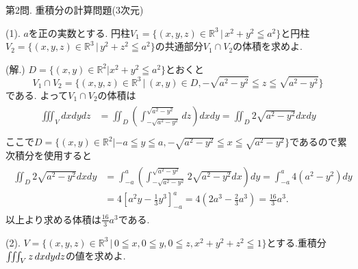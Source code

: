 \documentclass[dvipdfmx,a4paper,11pt]{article}
\newcommand{\R}{\mathbb{R}}
\theoremstyle{definition}
\begin{document}


\vspace{11pt}
{\Large 第2問.} 重積分の計算問題(3次元) 
\vspace{11pt}

{\large(1). $a$を正の実数とする. 円柱$V_1= \{ (x,y,z) \in \R^3 \,|\,x^2 + y^2 \leqq a^2\}$と円柱$V_2 = \{ (x,y,z) \in \R^3 \,|\, y^2 + z^2 \leqq a^2 \}$の共通部分$V_1 \cap V_2$の体積を求めよ.}\vspace{4pt}

\hspace{-11pt}(解.)
$D=\{ (x,y) \in \R^2 | x^2 + y^2 \leqq a^2\}$とおくと
$$
V_1 \cap V_2= \{ (x,y,z) \in \R^3 \,|\, (x,y) \in D, -\sqrt{a^2 -y^2} \leqq z \leqq  \sqrt{a^2-y^2} \}
$$
である. よって$V_1 \cap V_2$の体積は
\begin{align*}
\begin{split}
\iiint_{V} dxdydz 
&=
\iint_{D} \left( \int_{-\sqrt{a^2-y^2}}^{\sqrt{a^2 -y^2} } dz \right) dxdy
= \iint_{D} 2\sqrt{a^2  -y^2}dxdy \\
    \end{split}
  \end{align*}
  ここで$D=\{ (x,y) \in \R^2 | -a \leqq y \leqq a, -\sqrt{a^2 -y^2} \leqq x \leqq  \sqrt{a^2-y^2} \}$であるので累次積分を使用すると
 \begin{align*}
\begin{split}
\iint_{D} 2\sqrt{a^2  -y^2}dxdy 
&=\int_{-a}^{a} \left( \int_{ -\sqrt{a^2 -y^2}}^{\sqrt{a^2 -y^2}} 2\sqrt{a^2  -y^2} dx \right)dy
=\int_{-a}^{a}4(a^2 - y^2)dy\\
&= 4\left[ a^2y - \frac{1}{3}y^3\right]_{-a}^{a}
= 4\left(2a^3 - \frac{2}{3}a^3\right)=\frac{16}{3}a^3.
    \end{split}
  \end{align*}
  以上より求める体積は$\frac{16}{3}a^3$である.
  \vspace{7pt}

{\large(2). $V=\{ (x,y,z) \in \R^3 \,|\,  0 \leqq x, 0 \leqq y, 0 \leqq z, x^2+y^2+z^2 \leqq 1\}$とする.重積分$\iiint_{V} z \text{\,}dxdydz$の値を求めよ.}
\end{document}
